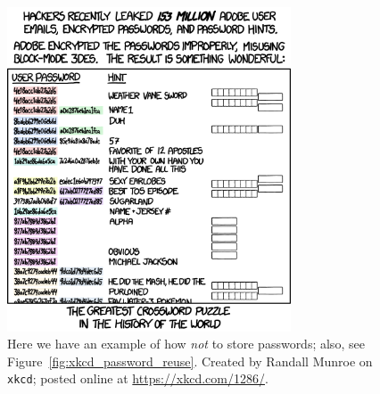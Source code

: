 \begin{figure}[t]
\centering
    \includegraphics[width=0.75\textwidth]{figures/xkcd/xkcd_1286_encryptic.png}
    \caption[\texttt{xkcd} Encryptic]{Here we have an example of how
        \emph{not} to store passwords;
        also, see Figure~\ref{fig:xkcd_password_reuse}.
        Created by Randall Munroe on \texttt{xkcd};
        posted online at \url{https://xkcd.com/1286/}.
        }
    \label{fig:xkcd_encryptic}
\end{figure}
